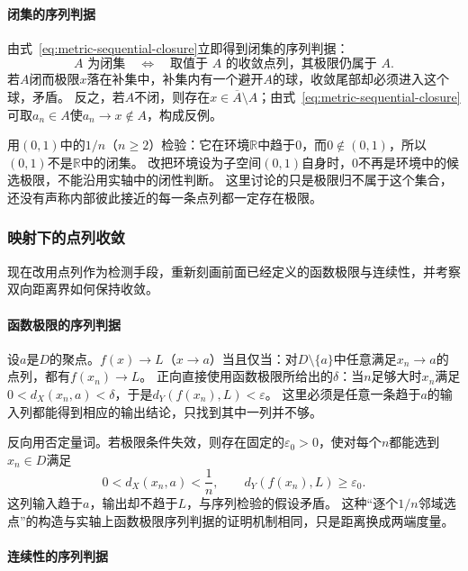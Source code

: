\paragraph{闭集的序列判据}

由式~\eqref{eq:metric-sequential-closure}立即得到闭集的序列判据：
\begin{equation}
\label{eq:metric-sequential-closed}
  A\text{ 为闭集}
  \quad\Longleftrightarrow\quad
  \text{取值于 }A\text{ 的收敛点列，其极限仍属于 }A.
\end{equation}
若$A$闭而极限$x$落在补集中，补集内有一个避开$A$的球，收敛尾部却必须进入这个球，矛盾。
反之，若$A$不闭，则存在$x\in\overline A\setminus A$；由式~\eqref{eq:metric-sequential-closure}可取$a_n\in A$使$a_n\to x\notin A$，构成反例。

用$(0,1)$中的$1/n$（$n\geq2$）检验：它在环境$\mathbb R$中趋于$0$，而$0\notin(0,1)$，所以$(0,1)$不是$\mathbb R$中的闭集。
改把环境设为子空间$(0,1)$自身时，$0$不再是环境中的候选极限，不能沿用实轴中的闭性判断。
这里讨论的只是极限归不属于这个集合，还没有声称内部彼此接近的每一条点列都一定存在极限。

\subsubsection{映射下的点列收敛}
\label{sec:metric-map-sequence-tests}

现在改用点列作为检测手段，重新刻画前面已经定义的函数极限与连续性，并考察双向距离界如何保持收敛。

\paragraph{函数极限的序列判据}

设$a$是$D$的聚点。$f(x)\to L$（$x\to a$）当且仅当：对$D\setminus\{a\}$中任意满足$x_n\to a$的点列，都有$f(x_n)\to L$。
正向直接使用函数极限所给出的$\delta$：当$n$足够大时$x_n$满足$0<d_X(x_n,a)<\delta$，于是$d_Y(f(x_n),L)<\varepsilon$。
这里必须是任意一条趋于$a$的输入列都能得到相应的输出结论，只找到其中一列并不够。

反向用否定量词。若极限条件失效，则存在固定的$\varepsilon_0>0$，使对每个$n$都能选到$x_n\in D$满足
\[
  0<d_X(x_n,a)<\frac1n,\qquad d_Y(f(x_n),L)\geq\varepsilon_0.
\]
这列输入趋于$a$，输出却不趋于$L$，与序列检验的假设矛盾。
这种“逐个$1/n$邻域选点”的构造与实轴上函数极限序列判据的证明机制相同，只是距离换成两端度量。

\paragraph{连续性的序列判据}

